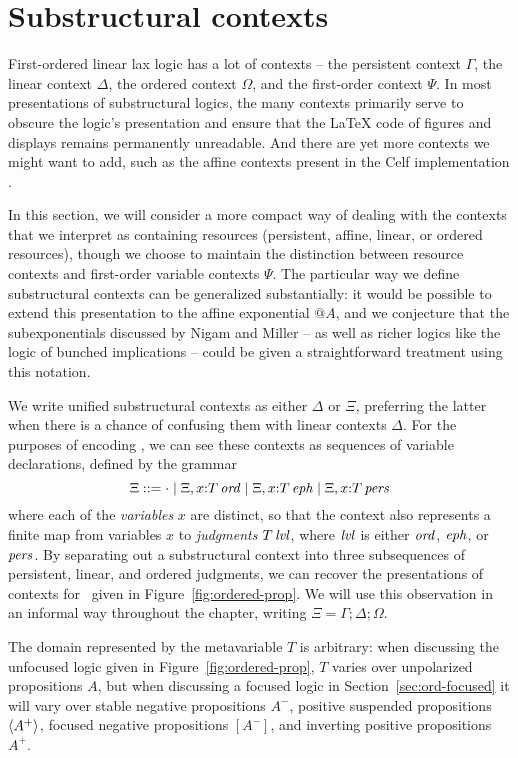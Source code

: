 \section{Substructural contexts}
\label{sec:contexts}

First-ordered linear lax logic has a lot of contexts -- the persistent
context $\Gamma$, the linear context $\Delta$, the ordered context
$\Omega$, and the first-order context $\Psi$. In most presentations
of substructural logics, the many
contexts primarily serve to obscure the logic's presentation
and ensure that the {\LaTeX} code of figures and displays remains
permanently unreadable. And there are yet more contexts we might want to 
add, such as the affine contexts present in the Celf implementation
\cite{schacknielsen08celf}.

In this section, we will consider a more compact way of dealing with
the contexts that we interpret as containing resources (persistent,
affine, linear, or ordered resources), though we choose to maintain
the distinction between resource contexts and first-order variable
contexts $\Psi$.  The particular way we define substructural contexts
can be generalized substantially: it would be possible to extend this
presentation to the affine exponential ${@}A$, and we conjecture that
the subexponentials discussed by Nigam and Miller
\cite{nigam09algorithmic} -- as well as richer logics like the logic of
bunched implications \cite{pym02semantics} -- could be given a
straightforward treatment using this notation.

We write unified substructural contexts as either $\Delta$ or $\Xi$,
preferring the latter when there is a chance of confusing them with
linear contexts $\Delta$. For the purposes of encoding \ollll, we can
see these contexts as sequences of variable declarations, defined by
the grammar
\[
\Xi ::= \cdot 
  \mid \Xi, x{:}{T}\,{{\it ord}}
  \mid \Xi, x{:}{T}\,{{\it eph}}
  \mid \Xi, x{:}{T}\,{{\it pers}}
\]
where each of the {\em variables} $x$ are distinct, so that the
context also represents a finite map from variables $x$ to {\it
  judgments} ${T}\,{{\it lvl}}$, where ${\it lvl}$ is either ${\it ord}$, ${\it eph}$,
or ${\it pers}$.  By separating out a substructural context into three
subsequences of persistent, linear, and ordered judgments, we can
recover the presentations of contexts for \ollll~given in
Figure~\ref{fig:ordered-prop}. We will use this observation in an
informal way throughout the chapter, writing $\Xi = \Gamma; \Delta;
\Omega$.

The domain represented by the metavariable $T$ is arbitrary: when
discussing the unfocused logic given in Figure~\ref{fig:ordered-prop},
$T$ varies over unpolarized propositions $A$, but when discussing a
focused logic in Section~\ref{sec:ord-focused} it will vary over
stable negative propositions $A^-$, positive suspended propositions
$\langle {A^+} \rangle$, focused negative propositions $[A^-]$, and inverting
positive propositions $A^+$.



